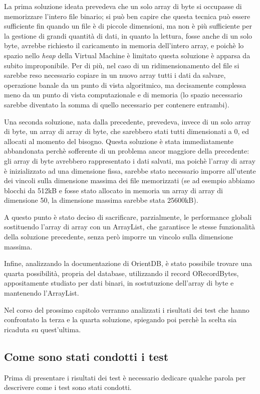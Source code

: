 La prima soluzione ideata prevedeva che un solo array di byte si occupasse di memorizzare l'intero file binario; si può ben capire che questa tecnica può essere sufficiente fin quando un file è di piccole dimensioni, ma non è più sufficiente per la gestione di grandi quantità di dati, in quanto la lettura, fosse anche di un solo byte, avrebbe richiesto il caricamento in memoria dell'intero array, e poichè lo spazio nello \emph{heap} della Virtual Machine è limitato questa soluzione è apparsa da subito improponibile. Per di più, nel caso di un ridimensionamento del file si sarebbe reso necessario copiare in un nuovo array tutti i dati da salvare, operazione banale da un punto di vista algoritmico, ma decisamente complessa meno da un punto di vista computazionale e di memoria (lo spazio necessario sarebbe diventato la somma di quello necessario per contenere entrambi).

Una seconda soluzione, nata dalla precedente, prevedeva, invece di un solo array di byte, un array di array di byte, che sarebbero stati tutti dimensionati a 0, ed allocati al momento del bisogno. Questa soluzione è stata immediatamente abbandonata perchè sofferente di un problema ancor maggiore della precedente: gli array di byte avrebbero rappresentato i dati salvati, ma poichè l'array di array è inizializzato ad una dimensione fissa, sarebbe stato necessario imporre all'utente dei vincoli sulla dimensione massima dei file memorizzati (se ad esempio abbiamo blocchi da 512kB e fosse stato allocato in memoria un array di array di dimensione 50, la dimensione massima sarebbe stata 25600kB).

A questo punto è stato deciso di sacrificare, parzialmente, le performance globali sostituendo l'array di array con un ArrayList, che garantisce le stesse funzionalità della soluzione precedente, senza però imporre un vincolo sulla dimensione massima.

Infine, analizzando la documentazione di OrientDB, è stato possibile trovare una quarta possibilità, propria del database, utilizzando il record ORecordBytes, appositamente studiato per dati binari, in sostutuzione dell'array di byte e mantenendo l'ArrayList.

Nel corso del prossimo capitolo verranno analizzati i risultati dei test che hanno confrontato la terza e la quarta soluzione, spiegando poi perchè la scelta sia ricaduta su quest'ultima.

\subsection{Come sono stati condotti i test}
Prima di presentare i risultati dei test è necessario dedicare qualche parola per descrivere come i test sono stati condotti.

